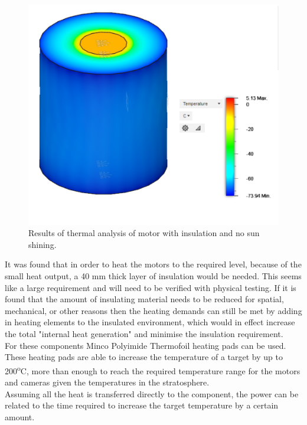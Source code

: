 	\begin{figure}[H]
    \centering
    \includegraphics[scale=0.6]{4-experiment-design/img/mechanical/thermalmotors.PNG}
	\caption{Results of thermal analysis of motor with insulation and no sun shining.}
	\label{fig:thermalmotors}
	\end{figure}

It was found that in order to heat the motors to the required level, because of the small heat output, a 40 mm thick layer of insulation would be needed. This seems like a large requirement and will need to be verified with physical testing. If it is found that the amount of insulating material needs to be reduced for spatial, mechanical, or other reasons then the heating demands can still be met by adding in heating elements to the insulated environment, which would in effect increase the total "internal heat generation" and minimise the insulation requirement.\\

For these components Minco Polyimide Thermofoil heating pads can be used. These heating pads are able to increase the temperature of a target by up to 200\textsuperscript{o}C, more than enough to reach the required temperature range for the motors and cameras given the temperatures in the stratosphere.\\

Assuming all the heat is transferred directly to the component, the power can be related to the time required to increase the target temperature by a certain amount.

